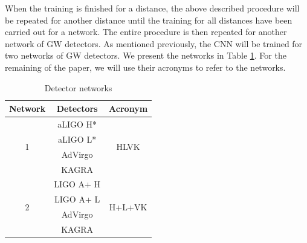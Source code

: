 \documentclass[aps,twocolumn,showpacs,groupedaddress, nofootinbib]{revtex4}  %
\begin{document}
When the training is finished for a distance, 
the above described procedure will be repeated for another distance until the training
for all distances have been carried out for a network.
The entire procedure is then repeated for another network of \ac{GW} detectors.
As mentioned previously, the \ac{CNN} will be trained for two networks of \ac{GW} detectors.
We present the networks in Table \ref{table:network}. For the remaining of the paper, we will use their acronyms to refer to the networks.
\begin{table}[]
\centering
\begin{threeparttable}
\caption{Detector networks}
\label{table:network}
\begin{tabular}{ccc}
\toprule
Network            & Detectors                & Acronym                 \\
\hline
\multirow{4}{*}{1} & \ac{aLIGO} H*    & \multirow{4}{*}{HLVK}   \\
                   & \ac{aLIGO} L* &                         \\
                   & \ac{AdVirgo}           &                         \\
                   & KAGRA                    &                         \\
                   \hline
\multirow{4}{*}{2} & LIGO A+ H          & \multirow{4}{*}{H+L+VK} \\
                   & LIGO A+ L       &                         \\
                   & \ac{AdVirgo}           &                         \\
                   & KAGRA                    &                         \\
\hline
\hline
\end{tabular}
\begin{tablenotes}
\setlength{}
\end{tablenotes}
\end{threeparttable}
\end{table}
\end{document}
